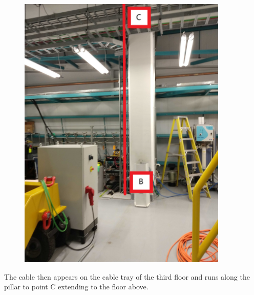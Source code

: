   \begin{figure}
    \centering
    \includegraphics[width=10cm]{images/13.jpg}
  \end{figure}
  The cable then appears on the cable tray of the third floor and runs along the pillar to point C extending to the floor above.

\newpage

